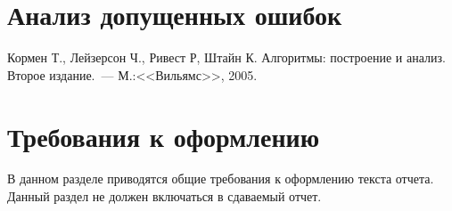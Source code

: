\documentclass[a4paper,12pt,titlepage,final]{article}
\begin{document}
\section{Анализ допущенных ошибок}


\newpage
\begin{raggedright}
\begin{thebibliography}{99}
 Кормен Т., Лейзерсон Ч., Ривест Р, Штайн К. Алгоритмы: построение и анализ.
    Второе издание.~--- М.:<<Вильямс>>, 2005.
\end{thebibliography}
\end{raggedright}

\newpage

\section*{Требования к оформлению}

В данном разделе приводятся общие требования к оформлению текста отчета.
Данный раздел не должен включаться в сдаваемый отчет.
\end{document}
